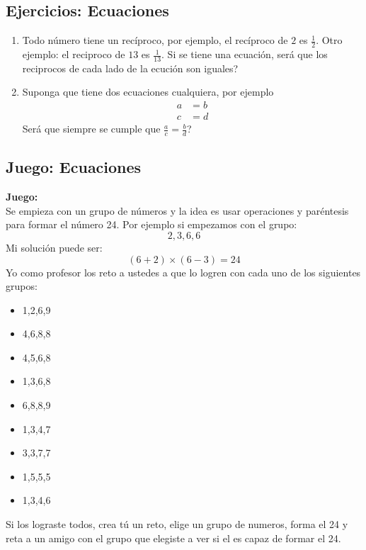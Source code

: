 \newpage

\begin{center}
	\vspace{-1cm}
	\subsection{ Ejercicios: Ecuaciones}\label{ejercicios:ecuaciones}
\end{center}

\begin{enumerate}
	\item Todo número tiene un recíproco, por ejemplo, el recíproco de $2$ es $\frac{1}{2}$. Otro ejemplo: el reciproco de $13$ es $\frac{1}{13}$. Si se tiene una ecuación, será que los reciprocos de cada lado de la ecución son iguales?
	
	\item Suponga que tiene dos ecuaciones cualquiera, por ejemplo
		\begin{align}
	a &= b\\
	c &= d
	\end{align}
	Será que siempre se cumple que $\frac{a}{c} = \frac{b}{d}$? 
	
\end{enumerate}
\newpage

\begin{center}
	\vspace{-1cm}
	\subsection{ Juego: Ecuaciones}
\end{center}
\begin{tcolorbox}[colback=yellow!15!white,colframe=black]
	\textbf{Juego: }\\
	Se empieza con un grupo de números y la idea es usar operaciones y paréntesis para formar el número 24. Por ejemplo
	si empezamos con el grupo:
	\[
	2,3,6,6
	\]
	Mi solución puede ser:
	\[
	(6+ 2)\times (6-3) = 24
	\]
	Yo como profesor los reto a ustedes a que lo logren con cada uno de los siguientes grupos:
		\begin{multicols}{3}
		\begin{itemize}
			\item 1,2,6,9
			\item 4,6,8,8
			\item 4,5,6,8
			\item 1,3,6,8
			\item 6,8,8,9
			\item 1,3,4,7
			\item 3,3,7,7
			\item 1,5,5,5
			\item 1,3,4,6									
		\end{itemize}
	\end{multicols}

		Si los lograste todos, crea tú un reto, elige un grupo de numeros, forma el 24 y reta a un amigo con el grupo que elegiste a ver si el es capaz de formar el 24.
\end{tcolorbox}



